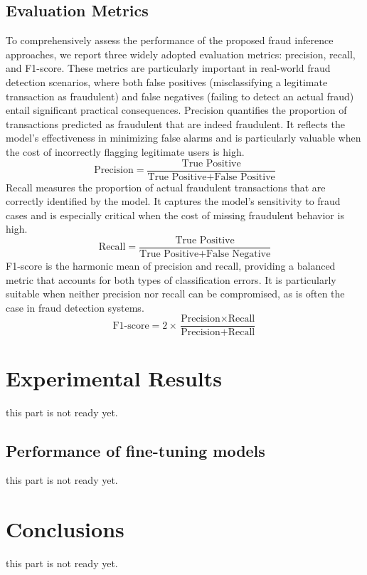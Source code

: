 \documentclass[sigconf]{acmart}
\begin{document}
\subsection{Evaluation Metrics}\label{evaluation_metrics}
To comprehensively assess the performance of the proposed fraud inference approaches, we report three widely adopted evaluation metrics: precision, recall, and F1-score. These metrics are particularly important in real-world fraud detection scenarios, where both false positives (misclassifying a legitimate transaction as fraudulent) and false negatives (failing to detect an actual fraud) entail significant practical consequences.
Precision quantifies the proportion of transactions predicted as fraudulent that are indeed fraudulent. It reflects the model's effectiveness in minimizing false alarms and is particularly valuable when the cost of incorrectly flagging legitimate users is high.
\begin{equation}
 \text{Precision} = \frac{\text{True Positive}}{\text{True Positive} + \text{False Positive}}
 \end{equation}
Recall measures the proportion of actual fraudulent transactions that are correctly identified by the model. It captures the model's sensitivity to fraud cases and is especially critical when the cost of missing fraudulent behavior is high.
\begin{equation}
 \text{Recall} = \frac{\text{True Positive}}{\text{True Positive} + \text{False Negative}}
 \end{equation}
F1-score is the harmonic mean of precision and recall, providing a balanced metric that accounts for both types of classification errors. It is particularly suitable when neither precision nor recall can be compromised, as is often the case in fraud detection systems.
\begin{equation}
 \text{F1-score} = 2 \times \frac{\text{Precision} \times \text{Recall}}{\text{Precision} + \text{Recall}}
 \end{equation}




\section{Experimental Results}\label{results}
this part is not ready yet.





\subsection{Performance of fine-tuning models}
this part is not ready yet.







\section{Conclusions}\label{conclusions}
this part is not ready yet.




 
\end{document}
